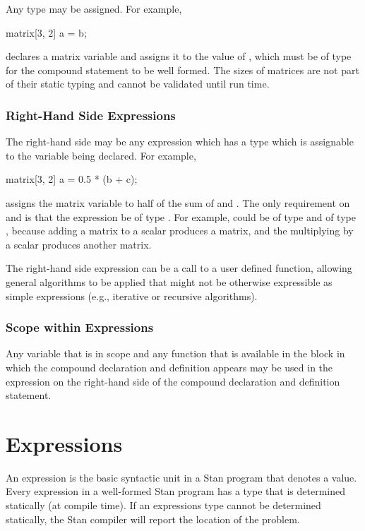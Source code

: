 Any type may be assigned.  For example,
%
\begin{stancode}
matrix[3, 2] a = b;
\end{stancode}
%
declares a matrix variable  and assigns it to the value of
, which must be of type  for the compound
statement to be well formed.  The sizes of matrices are not part of
their static typing and cannot be validated until run time.


\subsection{Right-Hand Side Expressions}

The right-hand side may be any expression which has a type which is
assignable to the variable being declared.  For example,
%
\begin{stancode}
matrix[3, 2] a = 0.5 * (b + c);
\end{stancode}
%
assigns the matrix variable  to half of the sum of 
and .  The only requirement on  and  is that
the expression  be of type .  For example,
 could be of type  and  of type
, because adding a matrix to a scalar produces a matrix,
and the multiplying by a scalar produces another matrix.

The right-hand side expression can be a call to a user defined
function, allowing general algorithms to be applied that might not be
otherwise expressible as simple expressions (e.g., iterative or
recursive algorithms).


\subsection{Scope within Expressions}

Any variable that is in scope and any function that is available in
the block in which the compound declaration and definition appears may
be used in the expression on the right-hand side of the compound
declaration and definition statement. 

\chapter{Expressions}

\noindent
An expression is the basic syntactic unit in a Stan program that
denotes a value.  Every expression in a well-formed Stan program has
a type that is determined statically (at compile time).  If an
expressions type cannot be determined statically, the Stan compiler
will report the location of the problem.

